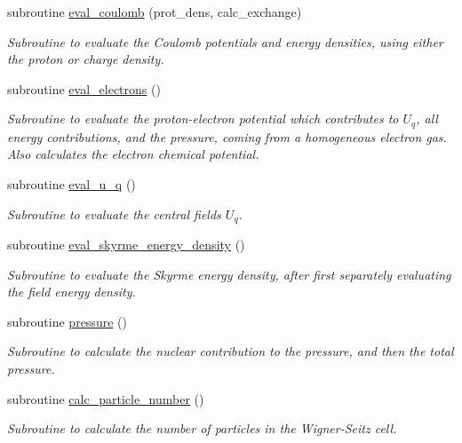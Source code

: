 \begin{DoxyCompactItemize}
subroutine \mbox{\hyperlink{namespaceroutines_a74ed186c93b400a14428192e1cb7a0b2}{eval\+\_\+coulomb}} (prot\+\_\+dens, calc\+\_\+exchange)
\begin{DoxyCompactList}\small\item\em Subroutine to evaluate the Coulomb potentials and energy densities, using either the proton or charge density. \end{DoxyCompactList}\item 
subroutine \mbox{\hyperlink{namespaceroutines_a0b55cc503c7168299be63556e2602bd0}{eval\+\_\+electrons}} ()
\begin{DoxyCompactList}\small\item\em Subroutine to evaluate the proton-\/electron potential which contributes to $U_q$, all energy contributions, and the pressure, coming from a homogeneous electron gas. Also calculates the electron chemical potential. \end{DoxyCompactList}\item 
subroutine \mbox{\hyperlink{namespaceroutines_a6ee5e5cd7ce81b013d18b19f5f9a4092}{eval\+\_\+u\+\_\+q}} ()
\begin{DoxyCompactList}\small\item\em Subroutine to evaluate the central fields $U_q$. \end{DoxyCompactList}\item 
subroutine \mbox{\hyperlink{namespaceroutines_ae210968d134fbcc79297971cc4fefb82}{eval\+\_\+skyrme\+\_\+energy\+\_\+density}} ()
\begin{DoxyCompactList}\small\item\em Subroutine to evaluate the Skyrme energy density, after first separately evaluating the field energy density. \end{DoxyCompactList}\item 
subroutine \mbox{\hyperlink{namespaceroutines_a383e2bf5a1fa37fbf95dd5f6ddbcc6be}{pressure}} ()
\begin{DoxyCompactList}\small\item\em Subroutine to calculate the nuclear contribution to the pressure, and then the total pressure. \end{DoxyCompactList}\item 
subroutine \mbox{\hyperlink{namespaceroutines_a0b8346e8e5457d6befb48b0ac56f4fdf}{calc\+\_\+particle\+\_\+number}} ()
\begin{DoxyCompactList}\small\item\em Subroutine to calculate the number of particles in the Wigner-\/\+Seitz cell. \end{DoxyCompactList}\item 

\end{DoxyCompactItemize}
